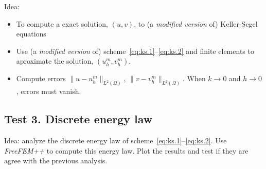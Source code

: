 \documentclass[a4wide]{article}
\newcommand{\um}{u^m}
\newcommand{\vm}{v^m}
\begin{document}
Idea:
\begin{itemize}
\item To compute a exact solution, $(u,v)$, to (a \textit{modified version} of)
  Keller-Segel equations
\item Use (a \textit{modified version} of)
  scheme~\eqref{eq:ks.1}--\eqref{eq:ks.2} and finite elements to
  aproximate the solution, $(\um_h, \vm_h)$.
\item Compute errors $\|u-\um_h\|_{L^2(\Omega)}$,
  $\|v-\vm_h\|_{L^2(\Omega)}$. When $k\to 0$ and $h\to 0$, errors must
  vanish.
\end{itemize}

\subsection*{Test 3. Discrete energy law}

Idea: analyze the discrete energy law of
scheme~\eqref{eq:ks.1}--\eqref{eq:ks.2}. Use \textit{FreeFEM++} to
compute this energy law. Plot the results and test if they are
agree with the previous analysis.
\end{document}
